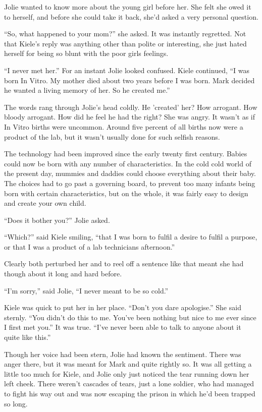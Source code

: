 Jolie wanted to know more about the young girl before her.  She felt she owed it to herself, and before she could take it back, she'd asked a very personal question.

``So, what happened to your mom?'' she asked.  It was instantly regretted.  Not that Kiele's reply was anything other than polite or interesting, she just hated herself for being so blunt with the poor girls feelings.

``I never met her.''  For an instant Jolie looked confused.  Kiele continued, ``I was born In Vitro.  My mother died about two years before I was born.  Mark decided he wanted a living memory of her.  So he created me.''  

The words rang through Jolie's head coldly.  He 'created' her?  How arrogant.  How bloody arrogant.  How did he feel he had the right?  She was angry.  It wasn't as if In Vitro births were uncommon.  Around five percent of all births now were a product of the lab, but it wasn't usually done for such selfish reasons.

The technology had been improved since the early twenty first century.  Babies could now be born with any number of characteristics.  In the cold cold world of the present day, mummies and daddies could choose everything about their baby.  The choices had to go past a governing board, to prevent too many infants being born with certain characteristics, but on the whole, it was fairly easy to design and create your own child.

``Does it bother you?'' Jolie asked.

``Which?'' said Kiele smiling, ``that I was born to fulfil a desire to fulfil a purpose, or that I was a product of a lab technicians afternoon.''

Clearly both perturbed her and to reel off a sentence like that meant she had though about it long and hard before.

``I'm sorry,'' said Jolie, ``I never meant to be so cold.''

Kiele was quick to put her in her place.  ``Don't you dare apologise.'' She said sternly.  ``You didn't do this to me.  You've been nothing but nice to me ever since I first met you.''  It was true.  ``I've never been able to talk to anyone about it quite like this.''

Though her voice had been stern, Jolie had known the sentiment.  There was anger there, but it was meant for Mark and quite rightly so.  It was all getting a little too much for Kiele, and Jolie only just noticed the tear running down her left cheek.  There weren't cascades of tears, just a lone soldier, who had managed to fight his way out and was now escaping the prison in which he'd been trapped so long.

